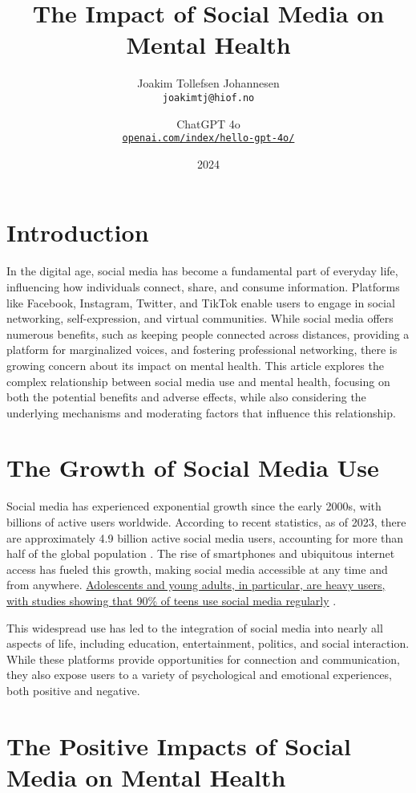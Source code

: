 \documentclass[12pt]{article}
\title{The Impact of Social Media on Mental Health}
\author{
    Joakim Tollefsen Johannesen\\
    \texttt{joakimtj@hiof.no}
    \and ChatGPT 4o\\
    \texttt{\href{https://openai.com/index/hello-gpt-4o/}{openai.com/index/hello-gpt-4o/}}
}
\date{2024}
\begin{document}

\maketitle
\section{Introduction}

In the digital age, social media has become a fundamental part of everyday life, influencing how individuals connect, share, and consume information. Platforms like Facebook, Instagram, Twitter, and TikTok enable users to engage in social networking, self-expression, and virtual communities. While social media offers numerous benefits, such as keeping people connected across distances, providing a platform for marginalized voices, and fostering professional networking, there is growing concern about its impact on mental health. This article explores the complex relationship between social media use and mental health, focusing on both the potential benefits and adverse effects, while also considering the underlying mechanisms and moderating factors that influence this relationship.

\section{The Growth of Social Media Use}

Social media has experienced exponential growth since the early 2000s, with billions of active users worldwide. According to recent statistics, as of 2023, there are approximately 4.9 billion active social media users, accounting for more than half of the global population \cite{statista2023}. The rise of smartphones and ubiquitous internet access has fueled this growth, making social media accessible at any time and from anywhere. \ul{Adolescents and young adults, in particular, are heavy users, with studies showing that 90\% of teens use social media regularly} \cite{smith2018}.

This widespread use has led to the integration of social media into nearly all aspects of life, including education, entertainment, politics, and social interaction. While these platforms provide opportunities for connection and communication, they also expose users to a variety of psychological and emotional experiences, both positive and negative.

\section{The Positive Impacts of Social Media on Mental Health}
\end{document}
